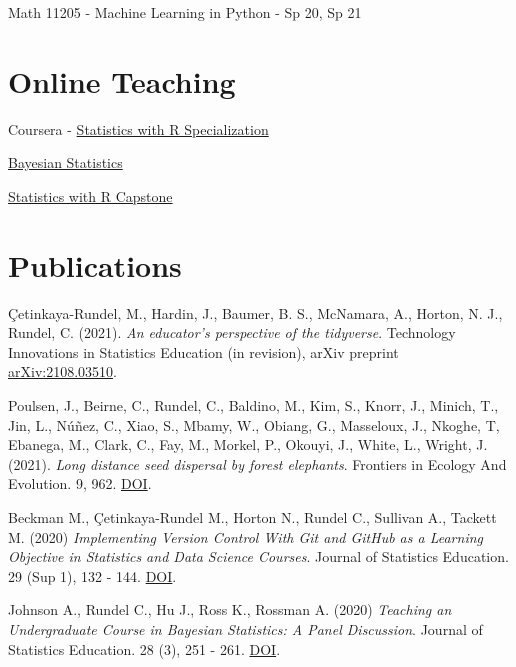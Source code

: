 \documentclass[margin,line]{res}
\begin{document}
\begin{resume}
\begin{list1}
\item[] Math 11205 - Machine Learning in Python - Sp 20, Sp 21
\end{list1}

\pagebreak


\section{\sc Online Teaching}

Coursera - \href{https://www.coursera.org/specializations/statistics}{Statistics with R Specialization}
\begin{list1}
\item[] \href{https://www.coursera.org/learn/bayesian}{Bayesian Statistics}
\item[] \href{https://www.coursera.org/learn/statistics-project}{Statistics with R Capstone}
\end{list1}

\section{\sc Publications}

Çetinkaya-Rundel, M., Hardin, J., Baumer, B. S., McNamara, A., Horton, N. J., Rundel, C. (2021). {\em An educator's perspective of the tidyverse}. Technology Innovations in Statistics Education (in revision), arXiv preprint \href{https://arxiv.org/abs/2108.03510}{arXiv:2108.03510}.

\vspace{-0.15cm}
Poulsen, J., Beirne, C., Rundel, C., Baldino, M., Kim, S., Knorr, J., Minich, T., Jin, L.,  Núñez, C., Xiao, S., Mbamy, W., Obiang, G., Masseloux, J., Nkoghe, T, Ebanega, M., Clark, C., Fay, M., Morkel, P., Okouyi, J., White, L., Wright, J. (2021). {\em Long distance seed dispersal by forest elephants}. Frontiers in Ecology And Evolution. 9, 962. \href{https://doi.org/10.3389/fevo.2021.789264}{DOI}.

\vspace{-0.15cm}
Beckman M., Çetinkaya-Rundel M., Horton N., Rundel C., Sullivan A., Tackett M. (2020) {\em Implementing Version Control With Git and GitHub as a Learning Objective in Statistics and Data Science Courses}. Journal of Statistics Education. 29 (Sup 1), 132 - 144. \href{https://doi.org/10.1080/10691898.2020.1848485}{DOI}.

\vspace{-0.15cm}
Johnson A., Rundel C., Hu J., Ross K., Rossman A. (2020) {\em Teaching an Undergraduate Course in Bayesian Statistics: A Panel Discussion}. Journal of Statistics Education. 28 (3), 251 - 261. \href{https://doi.org/10.1080/10691898.2020.1845499}{DOI}.



\end{resume}
\end{document}
